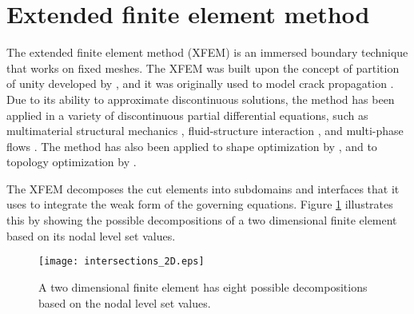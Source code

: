
\section{Extended finite element method}
\label{sec:intro_xfem}

The extended finite element method (XFEM) is an immersed boundary technique that works on fixed meshes. The XFEM was built upon the concept of partition of unity developed by \citep{NME:NME86}, and it was originally used to model crack propagation \citep{BB:99}. Due to its ability to approximate discontinuous solutions, the method has been applied in a variety of discontinuous partial differential equations, such as multimaterial structural mechanics \citep{WW:04c,VM:14}, fluid-structure interaction \citep{GW:08}, and multi-phase flows \citep{CB:03}. The method has also been applied to shape optimization by \citep{DMJ+:06,MMF+:05,MD:07}, and to topology optimization by \citep{HMM:13,LWW:12,WWX:10,MKM+:11,MM:14,VM:14}.

The XFEM decomposes the cut elements into subdomains and interfaces that it uses to integrate the weak form of the governing equations. Figure \ref{fig:triangulation_2D} illustrates this by showing the possible decompositions of a two dimensional finite element based on its nodal level set values.
%
\begin{figure}
	\centering
	\texttt{[image: intersections\_2D.eps]}
	\caption{A two dimensional finite element has eight possible decompositions based on the nodal level set values.}
	\label{fig:triangulation_2D}
\end{figure}

